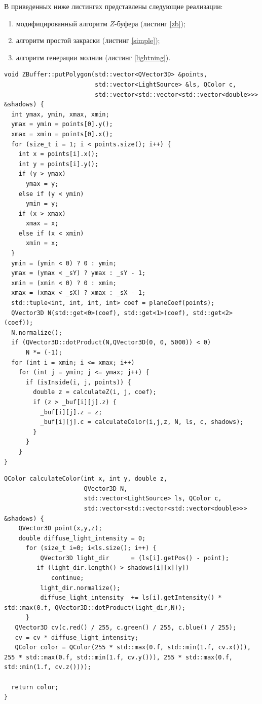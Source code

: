 В приведенных ниже листингах представлены следующие реализации:
\begin{enumerate}[label=\arabic*)]
    \item модифицированный алгоритм $Z$-буфера (листинг \ref{zb});
    \item алгоритм простой закраски (листинг \ref{simple});
    \item алгоритм генерации молнии (листинг \ref{lightning}).
\end{enumerate}
\clearpage
\begin{lstlisting}[firstnumber=1,caption={Реализация модифицированного алгоритма $Z$-буфера}, label=zb]
void ZBuffer::putPolygon(std::vector<QVector3D> &points,
                         std::vector<LightSource> &ls, QColor c,
                         std::vector<std::vector<std::vector<double>>> &shadows) {
  int ymax, ymin, xmax, xmin;
  ymax = ymin = points[0].y();
  xmax = xmin = points[0].x();
  for (size_t i = 1; i < points.size(); i++) {
    int x = points[i].x();
    int y = points[i].y();
    if (y > ymax)
      ymax = y;
    else if (y < ymin)
      ymin = y;
    if (x > xmax)
      xmax = x;
    else if (x < xmin)
      xmin = x;
  }
  ymin = (ymin < 0) ? 0 : ymin;
  ymax = (ymax < _sY) ? ymax : _sY - 1;
  xmin = (xmin < 0) ? 0 : xmin;
  xmax = (xmax < _sX) ? xmax : _sX - 1;
  std::tuple<int, int, int, int> coef = planeCoef(points);
  QVector3D N(std::get<0>(coef), std::get<1>(coef), std::get<2>(coef));
  N.normalize();
  if (QVector3D::dotProduct(N,QVector3D(0, 0, 5000)) < 0)
      N *= (-1);
  for (int i = xmin; i <= xmax; i++)
    for (int j = ymin; j <= ymax; j++) {
      if (isInside(i, j, points)) {
        double z = calculateZ(i, j, coef);
        if (z > _buf[i][j].z) {
          _buf[i][j].z = z;
          _buf[i][j].c = calculateColor(i,j,z, N, ls, c, shadows);
        }
      }
    }
}

\end{lstlisting}
\clearpage
\begin{lstlisting}[firstnumber=1,caption={Реализация алгоритма простой закраски}, label=simple]
QColor calculateColor(int x, int y, double z,
                      QVector3D N,
                      std::vector<LightSource> ls, QColor c,
                      std::vector<std::vector<std::vector<double>>> &shadows) {
    QVector3D point(x,y,z);
    double diffuse_light_intensity = 0;
      for (size_t i=0; i<ls.size(); i++) {
          QVector3D light_dir      = (ls[i].getPos() - point);
         if (light_dir.length() > shadows[i][x][y])
             continue;
          light_dir.normalize();
          diffuse_light_intensity  += ls[i].getIntensity() * std::max(0.f, QVector3D::dotProduct(light_dir,N));
      }
   QVector3D cv(c.red() / 255, c.green() / 255, c.blue() / 255);
   cv = cv * diffuse_light_intensity;
   QColor color = QColor(255 * std::max(0.f, std::min(1.f, cv.x())), 255 * std::max(0.f, std::min(1.f, cv.y())), 255 * std::max(0.f, std::min(1.f, cv.z())));

  return color;
}

\end{lstlisting}
